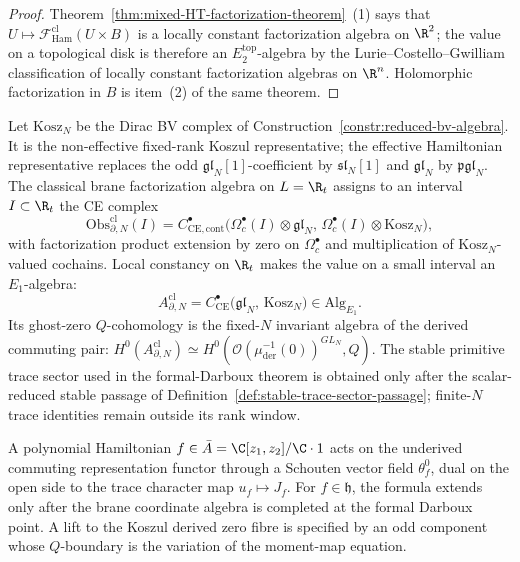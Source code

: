 \documentclass[11pt]{memoir}
\begin{document}
\begin{proof}
  Theorem~\ref{thm:mixed-HT-factorization-theorem}~(1) says that
  \(U\mapsto\mathcal F^{\mathrm{cl}}_{\mathrm{Ham}}(U\times B)\) is a
  locally constant factorization algebra on \(\R^2\); the value on a
  topological disk is therefore an \(E_2^{\mathrm{top}}\)-algebra by the
  Lurie--Costello--Gwilliam classification of locally constant
  factorization algebras on \(\R^n\).  Holomorphic factorization in
  \(B\) is item~(2) of the same theorem.
\end{proof}

\begin{defn}\label{def:E1-brane-algebra}
  Let \(\mathrm{Kosz}_N\) be the Dirac BV complex of
  Construction~\ref{constr:reduced-bv-algebra}.  It is the
  non-effective fixed-rank Koszul representative; the effective Hamiltonian
  representative replaces the odd \(\mathfrak{gl}_N[1]\)-coefficient by
  \(\mathfrak{sl}_N[1]\) and \(\mathfrak{gl}_N\) by \(\mathfrak{pgl}_N\).
  The classical brane
  factorization algebra on \(L=\R_t\) assigns to an interval
  \(I\subset\R_t\) the CE complex
  \[
    \mathrm{Obs}^{\mathrm{cl}}_{\partial,N}(I)
      =C^\bullet_{\mathrm{CE},\mathrm{cont}}\bigl(
       \Omega^\bullet_c(I)\otimes\mathfrak{gl}_N,\,
       \Omega^\bullet_c(I)\otimes\mathrm{Kosz}_N\bigr),
  \]
  with factorization product extension by zero on
  \(\Omega^\bullet_c\) and multiplication of \(\mathrm{Kosz}_N\)-valued
  cochains.  Local constancy on \(\R_t\) makes the value on a small
  interval an \(E_1\)-algebra:
  \[
	    A^{\mathrm{cl}}_{\partial,N}
	      =C^\bullet_{\mathrm{CE}}\bigl(\mathfrak{gl}_N,\,\mathrm{Kosz}_N\bigr)
	      \in\mathrm{Alg}_{E_1}.
  \]
  Its ghost-zero \(Q\)-cohomology is the fixed-\(N\) invariant
  algebra of the derived commuting pair:
  \(H^0(A^{\mathrm{cl}}_{\partial,N})\simeq
   H^0(\mathcal O(\mu^{-1}_{\mathrm{der}}(0))^{GL_N},Q)\).
  The stable primitive trace sector used in the formal-Darboux theorem
  is obtained only after the scalar-reduced stable passage of
  Definition~\ref{def:stable-trace-sector-passage}; finite-\(N\) trace
  identities remain outside its rank window.
\end{defn}

A polynomial Hamiltonian \(f\in\bar A=\C[z_1,z_2]/\C\cdot1\) acts on the underived
commuting representation functor through a Schouten vector field
\(\theta_f^0\), dual on the open side to the trace character map
\(u_f\mapsto J_f\).  For \(f\in\mathfrak h\), the formula extends only
after the brane coordinate algebra is completed at the formal Darboux
point.  A lift to the Koszul derived zero fibre is specified by an odd
component whose \(Q\)-boundary is the variation of the moment-map
equation.
\end{document}
